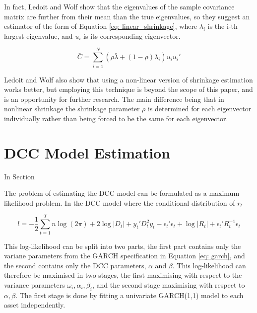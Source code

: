 \documentclass{article} %
\numberwithin{equation}{section} %
\numberwithin{figure}{section} %
\numberwithin{table}{section} %
\begin{document}
In fact, Ledoit and Wolf \cite{linear_shrinkage} show that the eigenvalues of the sample covariance matrix are further from their mean than the true eigenvalues, so they suggest an estimator of the form of Equation \ref{eq: linear_shrinkage}, where $\lambda_i$ is the i-th largest eigenvalue, and $u_i$ is its corresponding eigenvector.

\begin{equation} \label{eq: linear_shrinkage}
\bar{C} = \sum\limits_{i=1}^N \left(\rho \bar{\lambda} + (1 - \rho)\lambda_i \right) u_i u_i '
\end{equation}

Ledoit and Wolf also show \cite{non-linear shrinkage} that using a non-linear version of shrinkage estimation works better, but employing this technique is beyond the scope of this paper, and is an opportunity for further research. The main difference being that in nonlinear shrinkage the shrinkage parameter $\rho$ is determined for each eigenvector individually rather than being forced to be the same for each eigenvector.


\section{DCC Model Estimation}\label{section: dcc estimation}

In Section

The problem of estimating the DCC model can be formulated as a maximum likelihood problem. In the DCC model where the conditional distribution of $r_t$

\begin{equation}\label{eq: loglik}
l = - \frac{1}{2} \sum\limits_{t=1}^T n \log(2\pi) + 2 \log |D_t| + y_t' D_t^2y_t - \epsilon_t' \epsilon_t + \log |R_t| + \epsilon_t'R_t^{-1}\epsilon_t
\end{equation}

This log-likelihood can be split into two parts, the first part contains only the variane parameters from the GARCH specification in Equation \ref{eq: garch}, and the second contains only the DCC parameters, $\alpha$ and $\beta$. This log-likelihood can therefore be maximised in two stages, the first maximising with respect to the variance parameters $\omega_i, \alpha_i, \beta_i$, and the second stage maximising with respect to $\alpha, \beta$. The first stage is done by fitting a univariate GARCH(1,1) model to each asset independently.
\end{document}
